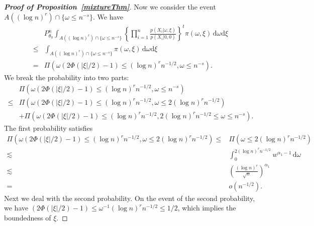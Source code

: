 \documentclass[11pt]{article}
\theoremstyle{plain}
\theoremstyle{definition}
\theoremstyle{remark}
\begin{document}
\begin{appendices}
\begin{proof}[\textbf{Proof of Proposition~\ref{mixtureThm}}]
Now we consider the event $A((\log n)^r)\cap \{\omega\leq n^{-s}\} $.
We have
\begin{align*}
    & P_{\theta_0}^n \int_{A( (\log n)^r )\cap \{\omega\leq n^{-s}\}} \left\{\prod_{i=1}^n \frac{p(X_i|\omega,\xi)}{p(X_i|0,0)}\right\}^t \pi(\omega,\xi)\, \mathrm d\omega \mathrm d\xi
    \\
    \leq & \int_{A( (\log n)^r )\cap \{\omega\leq n^{-s}\}} \pi(\omega,\xi)\, \mathrm d\omega \mathrm d\xi
    \\
    =&
    \Pi\left(\omega(2\Phi(|\xi|/2)-1)\leq (\log n)^r n^{-1/2}, \omega\leq n^{-s}\right).
\end{align*}
We break the probability into two parts: 
\begin{align*}
    &\Pi\left(\omega(2\Phi(|\xi|/2)-1)\leq (\log n)^r n^{-1/2}, \omega\leq n^{-s}\right)
    \\
    \leq &
    \Pi\left(\omega(2\Phi(|\xi|/2)-1)\leq (\log n)^r n^{-1/2}, \omega\leq  2(\log n)^r n^{-1/2}\right)
    \\
    &
    +
    \Pi\left(\omega(2\Phi(|\xi|/2)-1)\leq (\log n)^r n^{-1/2},   2(\log n)^r n^{-1/2} \leq \omega\leq n^{-s}\right)
    .
\end{align*}
The first probability satisfies
\begin{align*}
     \Pi\left(\omega(2\Phi(|\xi|/2)-1)
    \leq  (\log n)^r n^{-1/2}, \omega\leq  2(\log n)^r n^{-1/2}\right)
    \leq &
    \Pi\left( \omega\leq  2(\log n)^r n^{-1/2}\right)
    \\
    \lesssim  &
    \int_{0}^{2(\log n)^r n^{-1/2}} w^{\alpha_1-1}\, \mathrm d\omega
    \\
    \lesssim & \left(\frac{(\log n)^r}{\sqrt{n}}\right)^{\alpha_1}
    \\
    = & 
    o(n^{-1/2})
    .
\end{align*}
Next we deal with the second probability.
On the event of the second probability, we have
$
    (2\Phi(|\xi|/2)-1)\leq \omega^{-1} (\log n)^r n^{-1/2}\leq 1/2
    $,
which implies the boundedness of $\xi$.

\end{proof}
\end{appendices}
\end{document}
